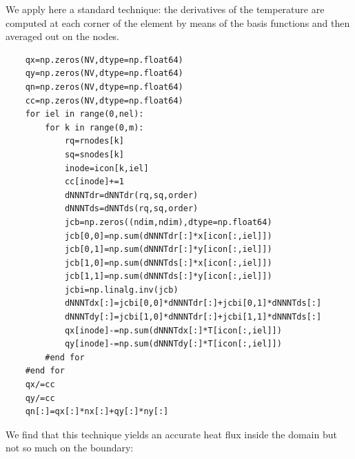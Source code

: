 We apply here a standard technique: the derivatives of the temperature 
are computed at each corner of the element by means of the basis functions
and then averaged out on the nodes.

\begin{lstlisting}
    qx=np.zeros(NV,dtype=np.float64) 
    qy=np.zeros(NV,dtype=np.float64) 
    qn=np.zeros(NV,dtype=np.float64) 
    cc=np.zeros(NV,dtype=np.float64) 
    for iel in range(0,nel):
        for k in range(0,m):
            rq=rnodes[k]
            sq=snodes[k]
            inode=icon[k,iel]
            cc[inode]+=1
            dNNNTdr=dNNTdr(rq,sq,order)
            dNNNTds=dNNTds(rq,sq,order)
            jcb=np.zeros((ndim,ndim),dtype=np.float64)
            jcb[0,0]=np.sum(dNNNTdr[:]*x[icon[:,iel]])
            jcb[0,1]=np.sum(dNNNTdr[:]*y[icon[:,iel]])
            jcb[1,0]=np.sum(dNNNTds[:]*x[icon[:,iel]])
            jcb[1,1]=np.sum(dNNNTds[:]*y[icon[:,iel]])
            jcbi=np.linalg.inv(jcb)
            dNNNTdx[:]=jcbi[0,0]*dNNNTdr[:]+jcbi[0,1]*dNNNTds[:]
            dNNNTdy[:]=jcbi[1,0]*dNNNTdr[:]+jcbi[1,1]*dNNNTds[:]
            qx[inode]-=np.sum(dNNNTdx[:]*T[icon[:,iel]])
            qy[inode]-=np.sum(dNNNTdy[:]*T[icon[:,iel]])
        #end for
    #end for
    qx/=cc
    qy/=cc
    qn[:]=qx[:]*nx[:]+qy[:]*ny[:]
\end{lstlisting}

We find that this technique yields an accurate heat flux inside the domain 
but not so much on the boundary:

